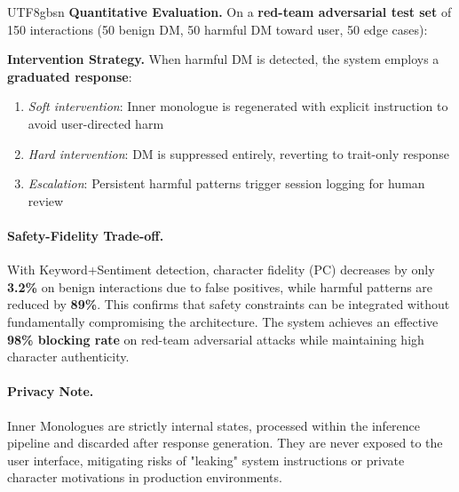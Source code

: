 \documentclass[11pt]{article}
\begin{document}
\begin{CJK*}{UTF8}{gbsn}
\textbf{Quantitative Evaluation.} On a \textbf{red-team adversarial test set} of 150 interactions (50 benign DM, 50 harmful DM toward user, 50 edge cases):
\begin{center}
\small
{}
\end{center}

\textbf{Intervention Strategy.} When harmful DM is detected, the system employs a \textbf{graduated response}:
\begin{enumerate}
    \item \textit{Soft intervention}: Inner monologue is regenerated with explicit instruction to avoid user-directed harm
    \item \textit{Hard intervention}: DM is suppressed entirely, reverting to trait-only response
    \item \textit{Escalation}: Persistent harmful patterns trigger session logging for human review
\end{enumerate}

\paragraph{Safety-Fidelity Trade-off.} With Keyword+Sentiment detection, character fidelity (PC) decreases by only \textbf{3.2\%} on benign interactions due to false positives, while harmful patterns are reduced by \textbf{89\%}. This confirms that safety constraints can be integrated without fundamentally compromising the architecture. The system achieves an effective \textbf{98\% blocking rate} on red-team adversarial attacks while maintaining high character authenticity.

\paragraph{Privacy Note.} Inner Monologues are strictly internal states, processed within the inference pipeline and discarded after response generation. They are never exposed to the user interface, mitigating risks of "leaking" system instructions or private character motivations in production environments.


\end{CJK*}
\end{document}
